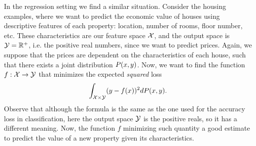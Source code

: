 %
In the regression setting we find a similar situation. Consider the housing examples, where we want to predict the economic value of houses using descriptive features of each property: location, number of rooms, floor number, etc. These characteristics are our feature space $\mathcal{X}$, and the output space is $\mathcal{Y} = \mathbb{R}^+$, i.e. the positive real numbers, since we want to predict prices. Again, we suppose that the prices are dependent on the characteristics of each house, such that there exists a joint distribution $P(x, y)$.
Now, we want to find the function $f: \mathcal{X} \to \mathcal{Y}$ that minimizes the expected \emph{squared} loss
$$ \int_{\mathcal{X} \times \mathcal{Y}} (y - f(x))^2 dP(x, y) .$$
Observe that although the formula is the same as the one used for the accuracy loss in classification, here the output space $\mathcal{Y}$ is the positive reals, so it has a different meaning. Now, the function $f$ minimizing such quantity a good estimate to predict the value of a new property given its characteristics.


